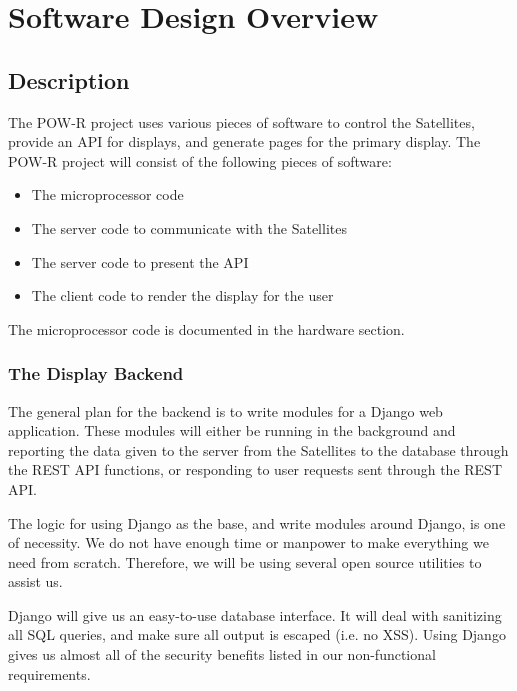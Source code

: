 
\chapter{Software Design Overview}

\section{Description}

The \ac{POW-R} project uses various pieces of software to control the Satellites, provide an \ac{API} for displays, and generate pages for the primary display.
The \ac{POW-R} project will consist of the following pieces of software:
\begin{itemize}
 \item The microprocessor code
 \item The server code to communicate with the Satellites
 \item The server code to present the \ac{API}
 \item The client code to render the display for the user
\end{itemize}

The microprocessor code is documented in the hardware section.

\subsection{The Display Backend}

The general plan for the backend is to write modules for a Django \cite{Web:Django} web application.
These modules will either be running in the background and reporting the data given to the server from the Satellites to the database through the \ac{REST} \ac{API} functions, or responding to user requests sent through the \ac{REST} \ac{API}.



The logic for using Django as the base, and write modules around Django, is one of necessity.
We do not have enough time or manpower to make everything we need from scratch.
Therefore, we will be using several open source utilities to assist us.


Django will give us an easy-to-use database interface.
It will deal with sanitizing all \ac{SQL} queries, and make sure all output is escaped (i.e. no \ac{XSS}).
Using Django gives us almost all of the security benefits listed in our non-functional requirements.

